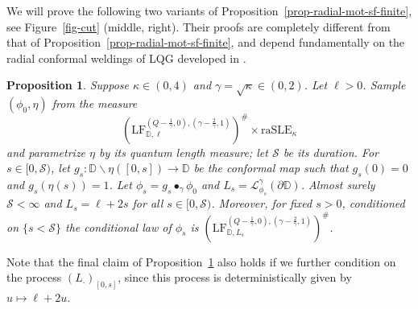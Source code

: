 \documentclass[a4paper]{article}
\numberwithin{equation}{section}
\newcommand{\bbD}{\mathbb{D}}
\newcommand{\D}{\mathbb{D}}
\newcommand{\cL}{\mathcal{L}}
\newcommand{\qduration}{\mathcal{S}}
\newcommand{\LF}{\mathrm{LF}}
\newtheorem{proposition}[theorem]{Proposition}
\theoremstyle{remark}
\numberwithin{equation}{section}
\begin{document}
We will prove the following two variants of Proposition~\ref{prop-radial-mot-sf-finite}, see Figure~\ref{fig-cut} (middle, right). Their proofs are completely different from that of Proposition~\ref{prop-radial-mot-sf-finite}, and depend fundamentally on the radial conformal weldings of LQG developed in \cite{ay-radial}.


\begin{proposition}\label{prop-radial-mot-simple-finite}
Suppose $\kappa \in (0,4)$ and $\gamma = \sqrt\kappa \in (0,2)$. Let $\ell > 0$. Sample $(\phi_0, \eta)$ from the measure 
\[
    (\LF_{\bbD,\ell}^{(Q-\frac{1}{\gamma},0),(\gamma - \frac2\gamma,1)})^\#\times \mathrm{raSLE}_\kappa\]
and parametrize $\eta$ by its quantum length  measure; let $\qduration$ be its duration. For $s \in [0,\qduration)$, let $g_s: \D \backslash \eta([0,s]) \to \D$ be the conformal map such that $g_s(0) = 0$ and $g_s(\eta(s)) = 1$. Let $\phi_s = g_s \bullet_\gamma \phi_0$ and $L_s = \cL_{\phi_s}^\gamma(\partial \D)$. Almost surely $\qduration < \infty$ and $L_s = \ell+2s$ for all $s \in [0,\qduration)$. Moreover, for fixed $s>0$,  conditioned on $\{s < \qduration\}$ the conditional law of $\phi_s$ is $(\LF_{\D, L_s}^{(Q - \frac1\gamma, 0), (\gamma - \frac2\gamma,1)})^\#$.
\end{proposition}
Note that the final claim of Proposition~\ref{prop-radial-mot-simple-finite} also holds if we further condition on the process $(L_\cdot)_{[0,s]}$, since this process is deterministically given by $u \mapsto \ell + 2u$. 
\end{document}
